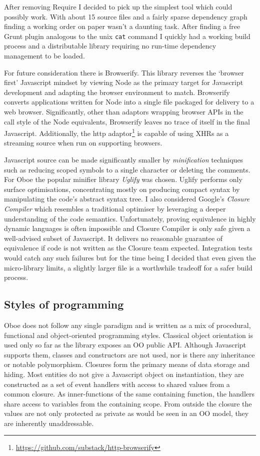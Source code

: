 \documentclass[12pt, ]{article}
\begin{document}
After removing Require I decided to pick up the simplest tool which
could possibly work. With about 15 source files and a fairly sparse
dependency graph finding a working order on paper wasn't a daunting
task. After finding a free Grunt plugin analogous to the unix
\texttt{cat} command I quickly had a working build process and a
distributable library requiring no run-time dependency management to be
loaded.

For future consideration there is Browserify. This library reverses the
`browser first' Javascript mindset by viewing Node as the primary target
for Javascript development and adapting the browser environment to
match. Browserify converts applications written for Node into a single
file packaged for delivery to a web browser. Significantly, other than
adaptors wrapping browser APIs in the call style of the Node
equivalents, Browserify leaves no trace of itself in the final
Javascript. Additionally, the http adaptor\footnote{\url{https://github.com/substack/http-browserify}}
is capable of using XHRs as a streaming source when run on supporting
browsers.

Javascript source can be made significantly smaller by
\emph{minification} techniques such as reducing scoped symbols to a
single character or deleting the comments. For Oboe the popular minifier
library \emph{Uglify} was chosen. Uglify performs only surface
optimisations, concentrating mostly on producing compact syntax by
manipulating the code's abstract syntax tree. I also considered Google's
\emph{Closure Compiler} which resembles a traditional optimiser by
leveraging a deeper understanding of the code semantics. Unfortunately,
proving equivalence in highly dynamic languages is often impossible and
Closure Compiler is only safe given a well-advised subset of Javascript.
It delivers no reasonable guarantee of equivalence if code is not
written as the Closure team expected. Integration tests would catch any
such failures but for the time being I decided that even given the
micro-library limits, a slightly larger file is a worthwhile tradeoff
for a safer build process.

\subsection{Styles of programming}\label{styles-of-programming}

Oboe does not follow any single paradigm and is written as a mix of
procedural, functional and object-oriented programming styles. Classical
object orientation is used only so far as the library exposes an OO
public API. Although Javascript supports them, classes and constructors
are not used, nor is there any inheritance or notable polymorphism.
Closures form the primary means of data storage and hiding. Most
entities do not give a Javascript object on instantiation, they are
constructed as a set of event handlers with access to shared values from
a common closure. As inner-functions of the same containing function,
the handlers share access to variables from the containing scope. From
outside the closure the values are not only protected as private as
would be seen in an OO model, they are inherently unaddressable.
\end{document}
